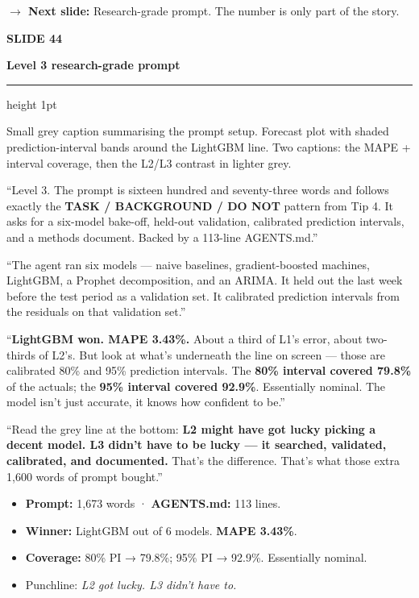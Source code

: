 \documentclass[11pt,a4paper]{article}
\newcommand{\slidehead}[2]{%
  \vspace{2pt}%
  {\small\color{mutedgrey}\textbf{SLIDE #1}}\par
  {\LARGE\color{jrcblue}\bfseries #2}\par
  \vspace{6pt}%
  {\color{jrcblue}\hrule height 1pt}%
  \vspace{8pt}%
}
\newcommand{\block}[1]{\par\vspace{4pt}{\small\color{jrcblue}\textbf{\MakeUppercase{#1}}}\par\vspace{2pt}}
\newenvironment{anchors}{%
  \begin{tcolorbox}[colback=jrcblue!6, colframe=jrcblue!50, boxrule=0.6pt, arc=2pt,
                    left=10pt, right=10pt, top=6pt, bottom=6pt, fontupper=\small,
                    title={\bfseries Anchor facts}, coltitle=jrcblue,
                    fonttitle=\small\bfseries, attach title to upper,
                    after title={\par\vspace{2pt}}]
}{%
  \end{tcolorbox}
}
\newenvironment{sayblock}{%
  \begin{tcolorbox}[colback=cardbg, colframe=jrcblue, boxrule=0.8pt, arc=2pt,
                    left=10pt, right=10pt, top=6pt, bottom=6pt, fontupper=\normalsize,
                    title={\bfseries Say this}, coltitle=white, colbacktitle=jrcblue,
                    fonttitle=\small\bfseries]
}{%
  \end{tcolorbox}
}
\newcommand{\transition}[1]{%
  \par\vspace{4pt}%
  \begin{tcolorbox}[colback=white, colframe=mutedgrey!40, boxrule=0.5pt, arc=2pt,
                    left=10pt, right=10pt, top=4pt, bottom=4pt, fontupper=\small]
    {\color{mutedgrey}\textbf{\textsf{$\to$ Next slide:}}} #1
  \end{tcolorbox}
}
\begin{document}
\transition{Research-grade prompt. The number is only part of the story.}

\newpage

\slidehead{44}{Level 3 \textendash{} research-grade prompt}

\block{On screen}
Small grey caption summarising the prompt setup. Forecast plot with shaded
prediction-interval bands around the LightGBM line. Two captions: the MAPE +
interval coverage, then the L2/L3 contrast in lighter grey.

\begin{sayblock}
``Level 3. The prompt is sixteen hundred and seventy-three words and follows
exactly the \textbf{TASK / BACKGROUND / DO NOT} pattern from Tip 4. It asks
for a six-model bake-off, held-out validation, calibrated prediction
intervals, and a methods document. Backed by a 113-line AGENTS.md.''\par\vspace{6pt}

``The agent ran six models — naive baselines, gradient-boosted machines,
LightGBM, a Prophet decomposition, and an ARIMA. It held out the last week
before the test period as a validation set. It calibrated prediction
intervals from the residuals on that validation set.''\par\vspace{4pt}

``\textbf{LightGBM won. MAPE 3.43\%.} About a third of L1's error, about
two-thirds of L2's. But look at what's underneath the line on screen — those
are calibrated 80\% and 95\% prediction intervals. The \textbf{80\% interval
covered 79.8\%} of the actuals; the \textbf{95\% interval covered 92.9\%}.
Essentially nominal. The model isn't just accurate, it knows how confident to
be.''\par\vspace{4pt}

``Read the grey line at the bottom: \textbf{L2 might have got lucky picking a
decent model. L3 didn't have to be lucky — it searched, validated,
calibrated, and documented.} That's the difference. That's what those extra
1,600 words of prompt bought.''
\end{sayblock}

\begin{anchors}
\begin{itemize}
\item \textbf{Prompt:} 1{,}673 words · \textbf{AGENTS.md:} 113 lines.
\item \textbf{Winner:} LightGBM out of 6 models. \textbf{MAPE 3.43\%}.
\item \textbf{Coverage:} 80\% PI → 79.8\%; 95\% PI → 92.9\%. Essentially nominal.
\item Punchline: \emph{L2 got lucky. L3 didn't have to.}
\end{itemize}
\end{anchors}
\end{document}

